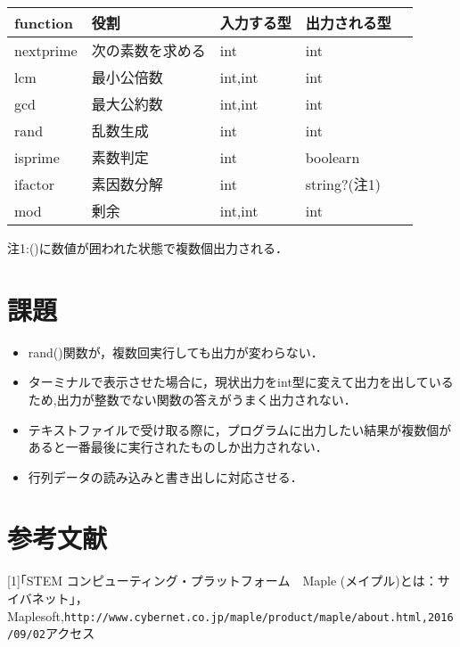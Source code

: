 \documentclass[10pt,a4j,twocolumn]{jsarticle}
\begin{document}
\begin{table}[htbp]\begin{center}
\caption{}
\begin{tabular}{lllll}
\hline
function  &役割  &入力する型  &出力される型  \\ \hline
nextprime  &次の素数を求める  &int  &int  \\
lcm  &最小公倍数  &int,int  &int  \\
gcd  &最大公約数  &int,int  &int  \\
rand  &乱数生成  &int  &int  \\
isprime  &素数判定  &int  &boolearn  \\
ifactor  &素因数分解  &int  &string?(注1)  \\
mod  &剰余  &int,int  &int  \\
\hline
\end{tabular}
\label{default}
\end{center}\end{table}

注1:()に数値が囲われた状態で複数個出力される．

\section{課題}
\begin{itemize}
\item rand()関数が，複数回実行しても出力が変わらない．
\item ターミナルで表示させた場合に，現状出力をint型に変えて出力を出しているため,出力が整数でない関数の答えがうまく出力されない．
\item テキストファイルで受け取る際に，プログラムに出力したい結果が複数個があると一番最後に実行されたものしか出力されない．
\item 行列データの読み込みと書き出しに対応させる．
\end{itemize}
\section{参考文献}
[1]｢STEM コンピューティング・プラットフォーム　Maple (メイプル)とは：サイバネット｣，Maplesoft,\verb|http://www.cybernet.co.jp/maple/product/maple/about.html,2016/09/02|アクセス
\end{document}
